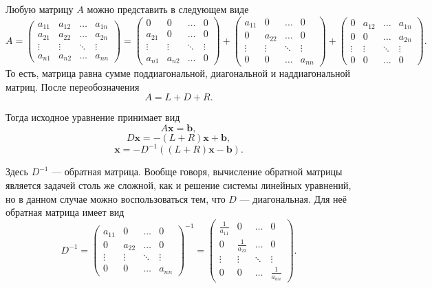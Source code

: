 Любую матрицу $A$ можно представить в следующем виде
\[
A=\begin{pmatrix}a_{11} & a_{12} & \dots & a_{1n}\\
a_{21} & a_{22} & \dots & a_{2n}\\
\vdots & \vdots & \ddots & \vdots\\
a_{n1} & a_{n2} & \ldots & a_{nn}
\end{pmatrix}=\begin{pmatrix}0 & 0 & \dots & 0\\
a_{21} & 0 & \dots & 0\\
\vdots & \vdots & \ddots & \vdots\\
a_{n1} & a_{n2} & \ldots & 0
\end{pmatrix}+\begin{pmatrix}a_{11} & 0 & \dots & 0\\
0 & a_{22} & \dots & 0\\
\vdots & \vdots & \ddots & \vdots\\
0 & 0 & \ldots & a_{nn}
\end{pmatrix}+\begin{pmatrix}0 & a_{12} & \dots & a_{1n}\\
0 & 0 & \dots & a_{2n}\\
\vdots & \vdots & \ddots & \vdots\\
0 & 0 & \ldots & 0
\end{pmatrix}.
\]
То есть, матрица равна сумме поддиагональной, диагональной и наддиагональной
матриц. После переобозначения
\[
A=L+D+R.
\]


Тогда исходное уравнение принимает вид
\[
A\mathbf{x}=\mathbf{b},
\]
\[
D\mathbf{x}=-(L+R)\mathbf{x}+\mathbf{b},
\]
\[
\mathbf{x}=-D^{-1}\left((L+R)\mathbf{x}-\mathbf{b}\right).
\]


Здесь $D^{-1}$ — обратная матрица. Вообще говоря, вычисление обратной
матрицы является задачей столь же сложной, как и решение системы линейных
уравнений, но в данном случае можно воспользоваться тем, что $D$
— диагональная. Для неё обратная матрица имеет вид
\[
D^{-1}=\begin{pmatrix}a_{11} & 0 & \dots & 0\\
0 & a_{22} & \dots & 0\\
\vdots & \vdots & \ddots & \vdots\\
0 & 0 & \ldots & a_{nn}
\end{pmatrix}^{-1}=\begin{pmatrix}\frac{1}{a_{11}} & 0 & \dots & 0\\
0 & \frac{1}{a_{22}} & \dots & 0\\
\vdots & \vdots & \ddots & \vdots\\
0 & 0 & \ldots & \frac{1}{a_{nn}}
\end{pmatrix}.
\]


